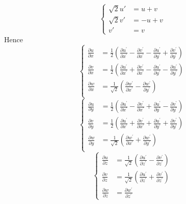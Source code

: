 \documentclass[12pt,a4]{ctexart}
\begin{document}
\begin{equation}
   \begin{cases}
	  \sqrt{2} u' & = u + v  \\
	  \sqrt{2} v' & = -u + v \\
	  v' & = v
   \end{cases}
\end{equation}
Hence
\begin{equation}
   \begin{cases}
	  \frac{\partial u}{\partial x} & =\frac{1}{2}\left(\frac{\partial u^{\prime}}{\partial x^{\prime}}-\frac{\partial v^{\prime}}{\partial x^{\prime}}-\frac{\partial u^{\prime}}{\partial y^{\prime}}+\frac{\partial v^{\prime}}{\partial y^{\prime}}\right) \\
	  \frac{\partial v}{\partial x} & =\frac{1}{2}\left(\frac{\partial u^{\prime}}{\partial x^{\prime}}+\frac{\partial v^{\prime}}{\partial x^{\prime}}-\frac{\partial u^{\prime}}{\partial y^{\prime}}-\frac{\partial u^{\prime}}{\partial y^{\prime}}\right) \\
	  \frac{\partial w}{\partial x} & =\frac{1}{\sqrt{2}}\left(\frac{\partial w^{\prime}}{\partial x^{\prime}}-\frac{\partial w^{\prime}}{\partial y^{\prime}}\right)                                                                                          \\
   \end{cases}
\end{equation}
\begin{equation}
   \begin{cases}
	  \frac{\partial u}{\partial y} & =\frac{1}{2}\left(\frac{\partial u^{\prime}}{\partial x^{\prime}}-\frac{\partial v^{\prime}}{\partial x^{\prime}}+\frac{\partial u^{\prime}}{\partial y^{\prime}}-\frac{\partial v^{\prime}}{\partial y^{\prime}}\right) \\
	  \frac{\partial v}{\partial y} & =\frac{1}{2}\left(\frac{\partial u^{\prime}}{\partial x^{\prime}}+\frac{\partial v^{\prime}}{\partial x^{\prime}}+\frac{\partial u^{\prime}}{\partial y^{\prime}}+\frac{\partial v^{\prime}}{\partial y^{\prime}}\right) \\
	  \frac{\partial w}{\partial y} & =\frac{1}{\sqrt{2}}\left(\frac{\partial w^{\prime}}{\partial x^{\prime}}+\frac{\partial w^{\prime}}{\partial y^{\prime}}\right)                                                                                          \\
   \end{cases}
\end{equation}
\begin{equation}
   \begin{cases}
	  \frac{\partial u}{\partial z} & =\frac{1}{\sqrt{2}}\left(\frac{\partial u^{\prime}}{\partial z^{\prime}}-\frac{\partial v^{\prime}}{\partial z^{\prime}}\right) \\
	  \frac{\partial v}{\partial z} & =\frac{1}{\sqrt{2}}\left(\frac{\partial u^{\prime}}{\partial z^{\prime}}+\frac{\partial v^{\prime}}{\partial z^{\prime}}\right) \\
	  \frac{\partial w}{\partial z} & =\frac{\partial w^{\prime}}{\partial z^{\prime}}
   \end{cases}
\end{equation}
\end{document}
